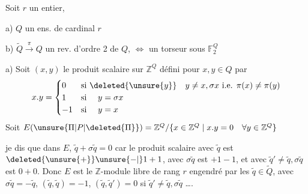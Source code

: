 Soit $r$ un entier,

a) $Q$ un ens. de cardinal $r$

b) $\widetilde Q\xrightarrow{\pi} Q$ un rev. d'ordre 2 de $Q$, $\Longleftrightarrow$ un torseur  \inserted{$\Pi$} sous $\mathbb F_2^Q$


a) Soit $(x,y)$ le produit scalaire sur $\mathbb Z^Q$ défini pour $x,y\in Q$ par
\[
x.y=\begin{cases}0&\text{si }\deleted{\unsure{y}}\quad y\ne x,\sigma x\ \text{i.e. }\pi(x)\ne\pi(y)\\
1&\text{si }\quad y=\sigma x\\
-1&\text{si }\quad y=x\end{cases}
\]
Soit $E(\unsure{\Pi|P|\deleted{\Pi}})=\mathbb Z^Q/\{x\in\mathbb Z^Q\mid x.y=0\quad\forall y\in\mathbb Z^Q\}$

  je dis que dans $E$, $\tilde q+\sigma\tilde q=0$  car le produit scalaire  avec $\tilde q$ est $\deleted{\unsure{+}}\unsure{-|{}}1+1$, avec $\sigma\tilde q$ est $+1-1$, et avec  $\tilde q'\ne\tilde q,\sigma\tilde q$ est $0+0$. Donc $E$ est le $\mathbb Z$-module libre de rang $r$ engendré par les $\tilde q\in\widetilde Q$, avec $\sigma\tilde q=-\tilde q$, $(\tilde q,\tilde q)=-1$, $(\tilde q,\tilde q')=0$ si $\tilde q'\ne\tilde q,\sigma\tilde q$ \ldots.

